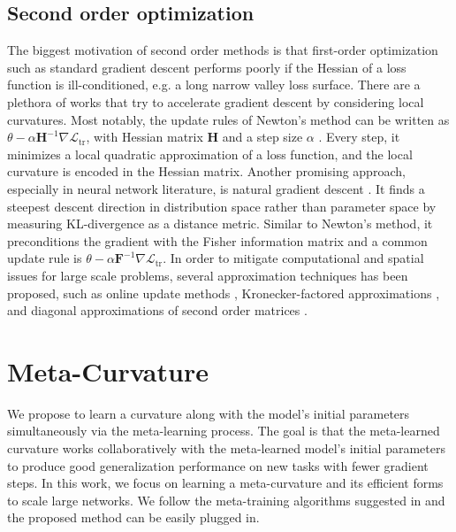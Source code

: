 \documentclass{article}
\begin{document}
\subsection{Second order optimization}
The biggest motivation of second order methods is that first-order optimization such as standard gradient descent performs poorly if the Hessian of a loss function is ill-conditioned, e.g. a long narrow valley loss surface. There are a plethora of works that try to accelerate gradient descent by considering local curvatures. Most notably, the update rules of Newton's method can be written as $\theta -  \alpha \mathbf{H}^{-1}\nabla \mathcal{L}_\textrm{tr}$, with Hessian matrix $\mathbf{H}$ and a step size $\alpha$ \cite{Nocedal_2006}. Every step, it minimizes a local quadratic approximation of a loss function, and the local curvature is encoded in the Hessian matrix. Another promising approach, especially in neural network literature, is natural gradient descent \cite{Amari}. It finds a steepest descent direction in distribution space rather than parameter space by measuring KL-divergence as a distance metric. Similar to Newton's method, it preconditions the gradient with the Fisher information matrix and a common update rule is $\theta - \alpha \mathbf{F}^{-1} \nabla \mathcal{L}_\textrm{tr}$. In order to mitigate computational and spatial issues for large scale problems, several approximation techniques has been proposed, such as online update methods \cite{Nocedal_2006, LeRoux-2008}, Kronecker-factored approximations \cite{Martens-icml-2015}, and diagonal approximations of second order matrices \cite{rmsprop,adam,adagrad}.

\section{Meta-Curvature}
\label{meta_curvature}

We propose to learn a curvature along with the model's initial parameters simultaneously via the meta-learning process. The goal is that the meta-learned curvature works collaboratively with the meta-learned model's initial parameters to produce good generalization performance on new tasks with fewer gradient steps. In this work, we focus on learning a meta-curvature and its efficient forms to scale large networks. We follow the meta-training algorithms suggested in \cite{Finn-icml-2017} and the proposed method can be easily plugged in. 
\end{document}
